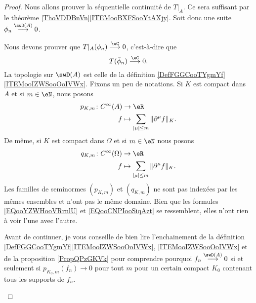 \begin{proof}
	Nous allons prouver la séquentielle continuité de \( T|_A\). Ce sera suffisant par le théorème \ref{ThoVDDBnVn}\ref{ITEMooBXFSooYtAXjy}. Soit donc une suite \( \phi_n\stackrel{\swD(A)}{\longrightarrow}0\).

	\begin{subproof}
		\spitem[Débroussailler]
		Nous devons prouver que \( T|_A(\phi_n)\stackrel{\eC}{\longrightarrow}0\), c'est-à-dire que
		\begin{equation}
			T(\bar \phi_n)\stackrel{\eC}{\longrightarrow}0.
		\end{equation}
		\spitem[Notations]
		La topologie sur \( \swD(A)\) est celle de la définition \ref{DefFGGCooTYgmYf}\ref{ITEMooIZWSooOoIVWx}. Fixons un peu de notations. Si \( K\) est compact dans \( A\) et si \( m\in\eN\), nous posons
		\begin{equation}        \label{EQooYZWHooVRrnlU}
			\begin{aligned}
				p_{K,m}\colon  C^{\infty}(A) & \to \eR                                                \\
				f                            & \mapsto \sum_{| \mu |\leq m}\| \partial^{\mu}f \|_{K}.
			\end{aligned}
		\end{equation}
		De même, si \( K\) est compact dans \( \Omega\) et si \( m\in \eN\) nous posons
		\begin{equation}        \label{EQooCNPIooSiqAzt}
			\begin{aligned}
				q_{K,m}\colon  C^{\infty}(\Omega) & \to \eR                                                \\
				f                                 & \mapsto \sum_{| \mu |\leq m}\| \partial^{\mu}f \|_{K}.
			\end{aligned}
		\end{equation}
		Les familles de seminormes \( (p_{K,m})\) et \( (q_{K,m})\) ne sont pas indexées par les mêmes ensembles et n'ont pas le même domaine. Bien que les formules \eqref{EQooYZWHooVRrnlU} et \eqref{EQooCNPIooSiqAzt} se ressemblent, elles n'ont rien à voir l'une avec l'autre.


		Avant de continuer, je vous conseille de bien lire l'enchainement de la définition \ref{DefFGGCooTYgmYf}\ref{ITEMooIZWSooOoIVWx}, \ref{ITEMooIZWSooOoIVWx} et de la proposition \ref{PropQPzGKVk} pour comprendre pourquoi \( f_n\stackrel{\swD(A)}{\longrightarrow}0\) si et seulement si \( p_{K_0,m}(f_n)\to 0\) pour tout \( m\) pour un certain compact \( K_0\) contenant tous les supports de \( f_n\).


\end{subproof}
\end{proof}
